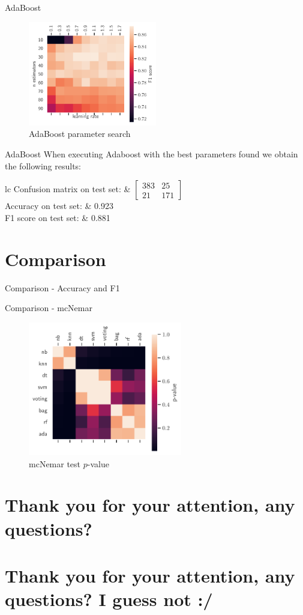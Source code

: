 \documentclass[aspectratio=169]{beamer}
\newcommand{\fresults}[3]{
\begin{table}[H]
\centering
\begin{tabular}{lc}
Confusion matrix on test set: & \( \begin{bmatrix} #1 \end{bmatrix} \) \\
    \addlinespace[0.5em]
    Accuracy on test set: & #2 \\
    F1 score on test set: & #3
\end{tabular}
\end{table}
}
\begin{document}
\begin{frame}{AdaBoost}
\begin{figure}[H]
\centering
\includegraphics[width=0.5\textwidth]{boosting}
\caption{AdaBoost parameter search}%
\label{fig:boosting}
\end{figure}

\end{frame}
\begin{frame}{AdaBoost}
When executing Adaboost with the best parameters found we obtain the following results:

\fresults{ 383 &  25 \\ 21 & 171 }{0.923}{0.881}
\end{frame}

\section{Comparison}

\begin{frame}{Comparison - Accuracy and F1}
\begin{table}[H]
\centering
\caption{Comparison of metrics}%
\label{tab:comparison}

\end{table}
\end{frame}

\begin{frame}{Comparison - mcNemar}
\begin{figure}[H]
\centering
\includegraphics[width=0.6\textwidth]{chi_mcnemar_pvalue}
\caption{mcNemar test $p$-value}
\end{figure}
\end{frame}

\section{Thank you for your attention, any questions?}
\section{Thank you for your attention, any questions? I guess not :/}
\end{document}
